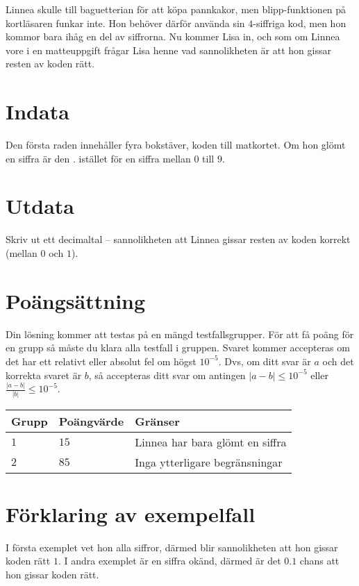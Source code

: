 Linnea skulle till baguetterian för att köpa pannkakor, men blipp-funktionen på kortläsaren funkar inte.
Hon behöver därför använda sin $4$-siffriga kod, men hon kommor bara ihåg en del av siffrorna.
Nu kommer Lisa in, och som om Linnea vore i en matteuppgift frågar Lisa henne vad sannolikheten är att hon gissar resten av koden rätt.   


\section*{Indata}
Den första raden innehåller fyra bokstäver, koden till matkortet. Om hon glömt en siffra är den . istället för en siffra mellan $0$ till $9$.

\section*{Utdata}
Skriv ut ett decimaltal -- sannolikheten att Linnea gissar resten av koden korrekt (mellan $0$ och $1$).

\section*{Poängsättning}
Din lösning kommer att testas på en mängd testfallsgrupper.
För att få poäng för en grupp så måste du klara alla testfall i gruppen.
Svaret kommer accepteras om det har ett relativt eller absolut fel om högst $10^{-5}$.
Dvs, om ditt svar är $a$ och det korrekta svaret är $b$, så accepteras ditt svar om
antingen $|a-b| \le 10^{-5}$ eller $\frac{|a-b|}{|b|} \le 10^{-5}$.

\noindent
\begin{tabular}{| l | l | p{12cm} |}
  \hline
  Grupp & Poängvärde & Gränser \\ \hline
  $1$   & $15$       & Linnea har bara glömt en siffra \\ \hline
  $2$   & $85$       & Inga ytterligare begränsningar  \\ \hline
\end{tabular}

\section*{Förklaring av exempelfall}
I första exemplet vet hon alla siffror, därmed blir sannolikheten att hon gissar koden rätt $1$.
I andra exemplet är en siffra okänd, därmed är det $0.1$ chans att hon gissar koden rätt.
